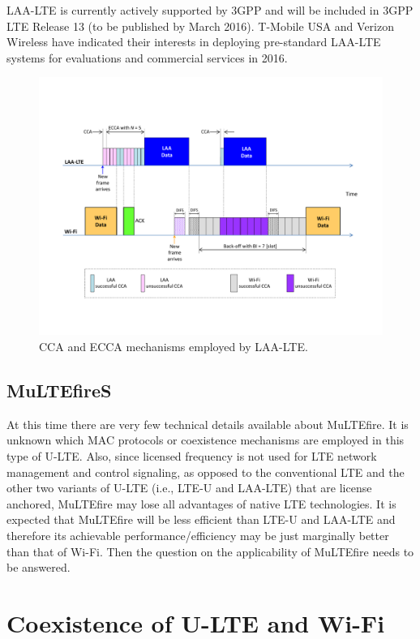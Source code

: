 LAA-LTE is currently actively supported by 3GPP and will be included in 3GPP LTE Release 13 (to be published by March 2016). T-Mobile USA and Verizon Wireless have indicated their interests in deploying pre-standard LAA-LTE systems for evaluations and commercial services in 2016.

\begin{figure}[!t]
	\centering
	\includegraphics[width=0.9\columnwidth]{figures2/LAA-LTE}
	\caption{CCA and ECCA mechanisms employed by LAA-LTE.}
	\label{figs:LAA-LTE}
\end{figure}

\subsection{MuLTEfireS}

At this time there are very few technical details available about MuLTEfire. It is unknown which MAC protocols or coexistence mechanisms are employed in this type of U-LTE. Also, since licensed frequency is not used for LTE network management and control signaling, as opposed to the conventional LTE and the other two variants of U-LTE (i.e., LTE-U and LAA-LTE) that are license anchored, MuLTEfire may lose all advantages of native LTE technologies. It is expected that MuLTEfire will be less efficient than LTE-U and LAA-LTE and therefore its achievable performance/efficiency may be just marginally better than that of Wi-Fi. Then the question on the applicability of MuLTEfire needs to be answered.


\section{Coexistence of U-LTE and Wi-Fi}
\label{coexist}

